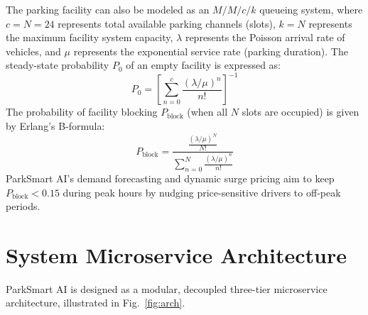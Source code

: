 \documentclass[conference,10pt]{IEEEtran}
\begin{document}
The parking facility can also be modeled as an $M/M/c/k$ queueing system, where $c = N = 24$ represents total available parking channels (slots), $k = N$ represents the maximum facility system capacity, $\lambda$ represents the Poisson arrival rate of vehicles, and $\mu$ represents the exponential service rate (parking duration). The steady-state probability $P_0$ of an empty facility is expressed as:
\begin{equation}
P_0 = \left[ \sum_{n=0}^{c} \frac{(\lambda / \mu)^n}{n!} \right]^{-1}
\end{equation}
The probability of facility blocking $P_{\text{block}}$ (when all $N$ slots are occupied) is given by Erlang's B-formula:
\begin{equation}
P_{\text{block}} = \frac{\frac{(\lambda / \mu)^N}{N!}}{\sum_{n=0}^{N} \frac{(\lambda / \mu)^n}{n!}}
\end{equation}
ParkSmart AI's demand forecasting and dynamic surge pricing aim to keep $P_{\text{block}} < 0.15$ during peak hours by nudging price-sensitive drivers to off-peak periods.

\section{System Microservice Architecture}

ParkSmart AI is designed as a modular, decoupled three-tier microservice architecture, illustrated in Fig.~\ref{fig:arch}.
\end{document}
